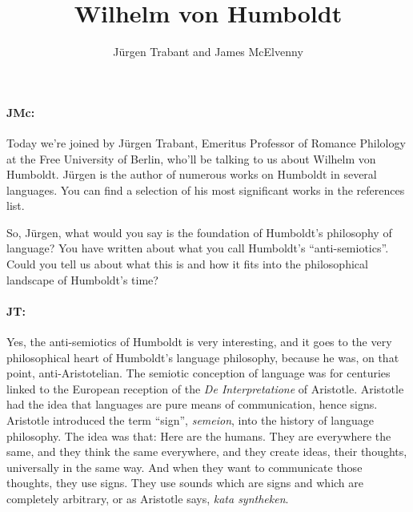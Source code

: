 \documentclass[output=paper]{langscibook}
\author{Jürgen Trabant\orcid{}\affiliation{Free University of Berlin} and James McElvenny\affiliation{University of Siegen}}
\title{Wilhelm von Humboldt}
\begin{document}
\maketitle 




\paragraph*{JMc:} Today we’re joined by Jürgen Trabant, Emeritus Professor of Romance Philology at the Free University of Berlin, who’ll be talking to us about Wilhelm von Humboldt. Jürgen is the author of numerous works on Humboldt in several languages. You can find a selection of his most significant works in the references list.

So, Jürgen, what would you say is the foundation of Humboldt’s philosophy of language? You have written about what you call Humboldt’s “anti-semiotics”. Could you tell us about what this is and how it fits into the philosophical landscape of Humboldt’s time?


\paragraph*{JT:} Yes, the anti-semiotics of Humboldt is very interesting, and it goes to the very philosophical heart of Humboldt’s language philosophy, because he was, on that point, anti-Aristotelian. The semiotic conception of language was for centuries linked to the European reception of the \textit{De Interpretatione} of Aristotle. Aristotle had the idea that languages are pure means of communication, hence signs. Aristotle introduced the term “sign”, \textit{semeion}, into the history of language philosophy. The idea was that: Here are the humans. They are everywhere the same, and they think the same everywhere, and they create ideas, their thoughts, universally in the same way. And when they want to communicate those thoughts, they use signs. They use sounds which are signs and which are completely arbitrary, or as Aristotle says, \textit{kata syntheken}.
\end{document}
